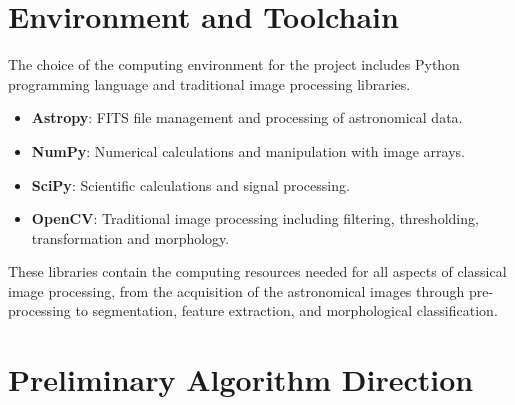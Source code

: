 \documentclass[11pt]{article}
\begin{document}
\section{Environment and Toolchain}

The choice of the computing environment for the project includes Python programming language and traditional image processing libraries.
\begin{itemize}
    \item \textbf{Astropy}: FITS file management and processing of astronomical data.
    \item \textbf{NumPy}: Numerical calculations and manipulation with image arrays.
    \item \textbf{SciPy}: Scientific calculations and signal processing.
    \item \textbf{OpenCV}: Traditional image processing including filtering, thresholding, transformation and morphology.

\end{itemize} 

These libraries contain the computing resources needed for all aspects of classical image processing, from the acquisition of the astronomical images through pre-processing to segmentation, feature extraction, and morphological classification.


\section{Preliminary Algorithm Direction}
\end{document}
